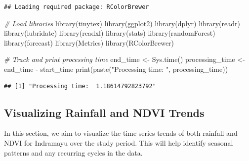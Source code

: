 \documentclass[
]{article}
\newenvironment{Shaded}{}{}
\newcommand{\CommentTok}[1]{\textcolor[rgb]{0.38,0.63,0.69}{\textit{#1}}}
\newcommand{\FunctionTok}[1]{\textcolor[rgb]{0.02,0.16,0.49}{#1}}
\newcommand{\NormalTok}[1]{#1}
\newcommand{\OtherTok}[1]{\textcolor[rgb]{0.00,0.44,0.13}{#1}}
\newcommand{\SpecialCharTok}[1]{\textcolor[rgb]{0.25,0.44,0.63}{#1}}
\newcommand{\StringTok}[1]{\textcolor[rgb]{0.25,0.44,0.63}{#1}}
\begin{document}
\begin{verbatim}
## Loading required package: RColorBrewer
\end{verbatim}

\begin{Shaded}
\begin{Highlighting}[]
\CommentTok{\# Load libraries}
\FunctionTok{library}\NormalTok{(tinytex)}
\FunctionTok{library}\NormalTok{(ggplot2)}
\FunctionTok{library}\NormalTok{(dplyr)}
\FunctionTok{library}\NormalTok{(readr)}
\FunctionTok{library}\NormalTok{(lubridate)}
\FunctionTok{library}\NormalTok{(readxl)}
\FunctionTok{library}\NormalTok{(stats)}
\FunctionTok{library}\NormalTok{(randomForest)}
\FunctionTok{library}\NormalTok{(forecast)}
\FunctionTok{library}\NormalTok{(Metrics)}
\FunctionTok{library}\NormalTok{(RColorBrewer)}

\CommentTok{\# Track and print processing time}
\NormalTok{end\_time }\OtherTok{\textless{}{-}} \FunctionTok{Sys.time}\NormalTok{()}
\NormalTok{processing\_time }\OtherTok{\textless{}{-}}\NormalTok{ end\_time }\SpecialCharTok{{-}}\NormalTok{ start\_time}
\FunctionTok{print}\NormalTok{(}\FunctionTok{paste}\NormalTok{(}\StringTok{"Processing time: "}\NormalTok{, processing\_time))}
\end{Highlighting}
\end{Shaded}

\begin{verbatim}
## [1] "Processing time:  1.18614792823792"
\end{verbatim}

\subsection{Visualizing Rainfall and NDVI
Trends}\label{visualizing-rainfall-and-ndvi-trends}

In this section, we aim to visualize the time-series trends of both
rainfall and NDVI for Indramayu over the study period. This will help
identify seasonal patterns and any recurring cycles in the data.
\end{document}
